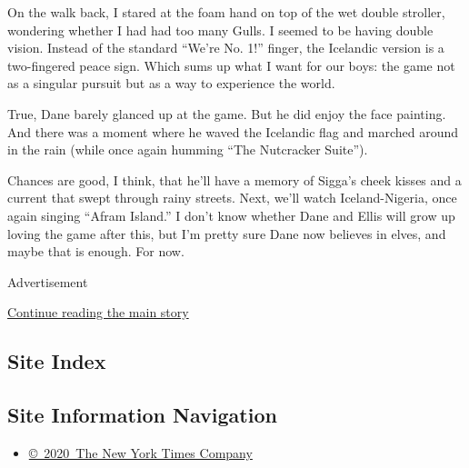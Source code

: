 On the walk back, I stared at the foam hand on top of the wet double
stroller, wondering whether I had had too many Gulls. I seemed to be
having double vision. Instead of the standard ``We're No. 1!'' finger,
the Icelandic version is a two-fingered peace sign. Which sums up what I
want for our boys: the game not as a singular pursuit but as a way to
experience the world.

True, Dane barely glanced up at the game. But he did enjoy the face
painting. And there was a moment where he waved the Icelandic flag and
marched around in the rain (while once again humming ``The Nutcracker
Suite'').

Chances are good, I think, that he'll have a memory of Sigga's cheek
kisses and a current that swept through rainy streets. Next, we'll watch
Iceland-Nigeria, once again singing ``Afram Island.'' I don't know
whether Dane and Ellis will grow up loving the game after this, but I'm
pretty sure Dane now believes in elves, and maybe that is enough. For
now.

Advertisement

\protect\hyperlink{after-bottom}{Continue reading the main story}

\hypertarget{site-index}{%
\subsection{Site Index}\label{site-index}}

\hypertarget{site-information-navigation}{%
\subsection{Site Information
Navigation}\label{site-information-navigation}}

\begin{itemize}
\tightlist
\item
  \href{https://help.nytimes.com/hc/en-us/articles/115014792127-Copyright-notice}{©~2020~The
  New York Times Company}
\end{itemize}

